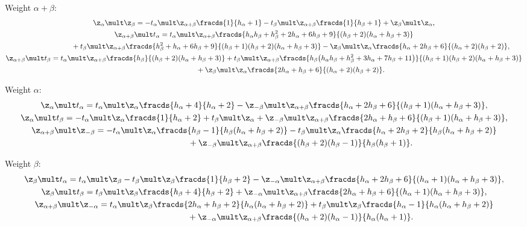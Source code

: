 \documentclass[pdftex]{sigma}
\def\a{\alpha}\def\Ar{{\rm A}}\def\Ab{\bar{\rm A}}\def\b{\beta}\def\bb{\mathfrak{b}}
\numberwithin{equation}{section}
\begin{document}
Weight $\alpha +\beta$:
\begin{gather}
\z_\a\mult\z_\b = -t_\a\mult \z_{\a +\b} \fracds{1}{h_\a +1}-t_\b\mult \z_{\a +\b} \fracds{1}{h_\b +1}+\z_\b\mult\z_\a  ,\\
 \nonumber \z_{\a +\b}\mult t_\a = t_\a\mult \z_{\a +\b}
 \fracds{h_\a h_\b+h_\b^2+2h_\a +6h_\b+9}{(h_\b +2)(h_\a +h_\b +3)}\\
\phantom{\z_{\a +\b}\mult t_\a =}{} +
t_\b\mult \z_{\a +\b} \fracds{h_\b^2+h_\a +6h_\b+9}{(h_\b +1)(h_\b +2)(h_\a +h_\b+3)}
 - \z_\b\mult \z_\a \fracds{h_\a +2h_\b +6}{(h_\a +2)(h_\b +2)} ,\\
 \nonumber \z_{\a +\b}\mult t_\b = t_\a\mult \z_{\a +\b} \fracds{h_\b}{(h_\b +2)(h_\a +h_\b+3)}+  t_\b\mult \z_{\a +\b}
 \fracds{h_\b \bigl( h_\a h_\b+h_\b^2+3h_\a +7h_\b+11\bigr)}{(h_\b +1)(h_\b +2)(h_\a +h_\b +3)}\\
\phantom{\z_{\a +\b}\mult t_\b =}{}
 +  \z_\b\mult \z_\a \fracds{2h_\a +h_\b +6}{(h_\a +2)(h_\b +2)} .
\end{gather}

Weight $\alpha$:
\begin{gather}
 \z_\a\mult t_\a =t_\a\mult \z_\a \fracds{h_\a +4}{h_\a +2}-\z_{-\b}\mult\z_{\a +\b} \fracds{h_\a +2h_\b +6}{(h_\b +1)(h_\a +h_\b +3)} ,\\
\z_\a\mult t_\b =-t_\a\mult \z_\a \fracds{1}{h_\a +2}+t_\b\mult \z_\a +\z_{-\b}\mult\z_{\a +\b} \fracds{2h_\a +h_\b +6}{(h_\b +1)(h_\a +h_\b +3)},\\
\nonumber \z_{\a +\b}\mult\z_{-\b}=-t_\a\mult \z_\a \fracds{h_\b -1}{h_\b (h_\a +h_\b +2)}
- t_\b\mult \z_\a \fracds{h_\a +2h_\b +2}{h_\b (h_\a +h_\b +2)}\\
\phantom{\z_{\a +\b}\mult\z_{-\b}=}{}
+ \z_{-\b}\mult\z_{\a +\b} \fracds{(h_\b +2)(h_\b -1)}{h_\b (h_\b +1)} .
\end{gather}

Weight $\beta$:
\begin{gather}
 \z_\b\mult t_\a =t_\a\mult \z_\b -t_\b\mult \z_\b \fracds{1}{h_\b +2}-\z_{-\a}\mult\z_{\a +\b} \fracds{h_\a +2h_\b +6}{(h_\a +1)(h_\a +h_\b +3)} ,\\
 \z_\b\mult t_\b =t_\b\mult \z_\b \fracds{h_\b +4}{h_\b +2}+\z_{-\a}\mult\z_{\a +\b} \fracds{2h_\a +h_\b +6}{(h_\a +1)(h_\a +h_\b +3)} ,\\
 \nonumber \z_{\a +\b}\mult\z_{-\a}=t_\a\mult \z_\b \fracds{2h_\a +h_\b +2}{h_\a (h_\a +h_\b +2)}
+t_\b\mult \z_\b \fracds{h_\a -1}{h_\a (h_\a +h_\b +2)}\\
\phantom{\z_{\a +\b}\mult\z_{-\a}=}{} +  \z_{-\a}\mult\z_{\a +\b} \fracds{(h_\a +2)(h_\a -1)}{h_\a (h_\a +1)}.
\end{gather}
\end{document}
